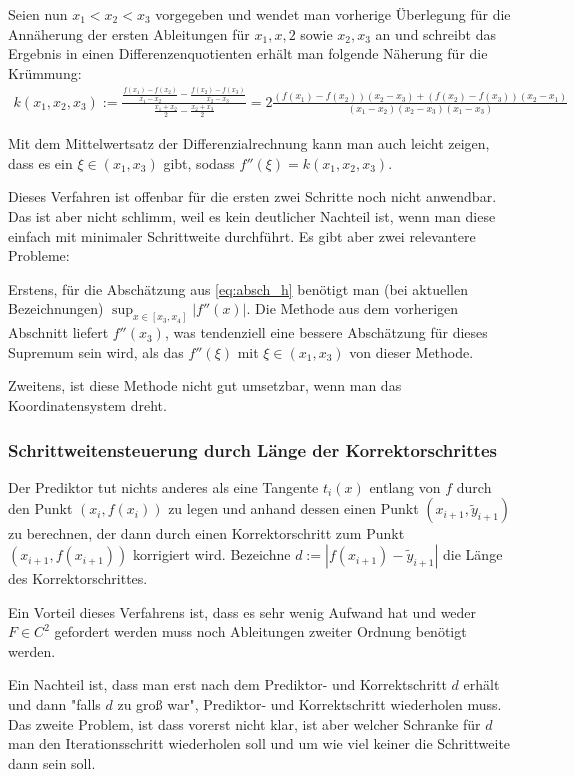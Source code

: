 \documentclass[a4paper,11pt,bibliography=totoc,listof=totoc,headinclude=true,cleardoublepage=empty,oneside]{scrartcl}
\newcounter{satz}
\begin{document}
Seien nun $x_1 < x_2 < x_3$ vorgegeben und wendet man vorherige Überlegung für die Annäherung der ersten Ableitungen für $x_1, x,2$ sowie $x_2,x_3$ an und schreibt das Ergebnis in einen Differenzenquotienten erhält man folgende Näherung für die Krümmung:
\begin{align*}
k(x_1,x_2,x_3) :=  \frac{\frac{f(x_1)-f(x_2)}{x_1-x_2} - \frac{f(x_2)-f(x_3)}{x_2-x_3}}{\frac{x_1+x_2}{2} - \frac{x_2+x_3}{2}  } 
=
2 \frac{(f(x_1)-f(x_2))(x_2-x_3) + (f(x_2)-f(x_3))(x_2-x_1)}{(x_1-x_2)(x_2-x_3)(x_1-x_3)}
\end{align*}

Mit dem Mittelwertsatz der Differenzialrechnung kann man auch leicht zeigen, dass es ein $\xi \in (x_1,x_3)$ gibt, sodass $f''(\xi) = k(x_1,x_2,x_3)$. 

Dieses Verfahren ist offenbar für die ersten zwei Schritte noch nicht anwendbar. Das ist aber nicht schlimm, weil es kein deutlicher Nachteil ist, wenn man diese einfach mit minimaler Schrittweite durchführt. Es gibt aber zwei relevantere Probleme:

Erstens, für die Abschätzung aus \eqref{eq:absch_h} benötigt man (bei aktuellen Bezeichnungen)  $\sup_{x \in [x_3,x_4]} |f''(x)|$. Die Methode aus dem vorherigen Abschnitt liefert $f''(x_3)$, was tendenziell eine bessere Abschätzung für dieses Supremum sein wird, als das $f''(\xi)$ mit $\xi \in (x_1,x_3)$ von dieser Methode.

Zweitens, ist diese Methode nicht gut umsetzbar, wenn man das Koordinatensystem dreht.

\subsubsection{Schrittweitensteuerung durch Länge der Korrektorschrittes}\label{chap:5.1.3}
Der Prediktor tut nichts anderes als eine Tangente $t_i(x)$ entlang von $f$ durch den Punkt $(x_i,f(x_i))$ zu legen und anhand dessen einen Punkt $(x_{i+1},\tilde{y}_{i+1})$ zu berechnen, der dann durch einen Korrektorschritt zum Punkt $(x_{i+1},f(x_{i+1}))$ korrigiert wird. Bezeichne $d:= |f(x_{i+1})-\tilde{y}_{i+1}|$ die Länge des Korrektorschrittes. 

Ein Vorteil dieses Verfahrens ist, dass es sehr wenig Aufwand hat und weder $F \in C^2$ gefordert werden muss noch Ableitungen zweiter Ordnung benötigt werden. 

Ein Nachteil ist, dass man erst nach dem Prediktor- und Korrektschritt $d$ erhält und dann "falls $d$ zu groß war", Prediktor- und Korrektschritt wiederholen muss. Das zweite Problem, ist dass vorerst nicht klar, ist aber welcher Schranke für $d$ man den Iterationsschritt wiederholen soll und um wie viel keiner die Schrittweite dann sein soll.
\end{document}
